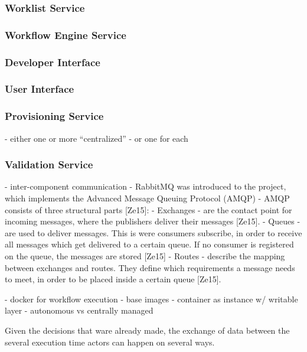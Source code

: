   \subsubsection{Worklist Service} %
    \label{ssub:worklist_service}

  \subsubsection{Workflow Engine Service} %
    \label{ssub:workflow_engine_service}

  \subsubsection{Developer Interface} %
    \label{ssub:developer_interface}

  \subsubsection{User Interface} %
    \label{ssub:user_interface}

  \subsubsection{Provisioning Service} %
    \label{ssub:provisioning_service}
      - either one or more ``centralized''
      - or one for each

  \subsubsection{Validation Service} %
    \label{ssub:valitation_service}


- inter-component communication
  - RabbitMQ was introduced to the project, which implements the Advanced Message Queuing Protocol (AMQP)
  - AMQP consists of three structural parts [Ze15]:
    - Exchanges
      -  are the contact point for incoming messages, where the publishers deliver their messages [Ze15].
    - Queues
      - are used to deliver messages. This is were consumers subscribe, in order to receive all messages which get delivered to a certain queue. If no consumer is registered on the queue, the messages are stored [Ze15]
    - Routes
      -  describe the mapping between exchanges and routes. They define which requirements a message needs to meet, in order to be placed inside a certain queue [Ze15].

- docker for workflow execution
  - base images
  - container as instance w/ writable layer
  - autonomous vs centrally managed


Given the decisions that ware already made, the exchange of data between the several execution time actors can happen on several ways.






